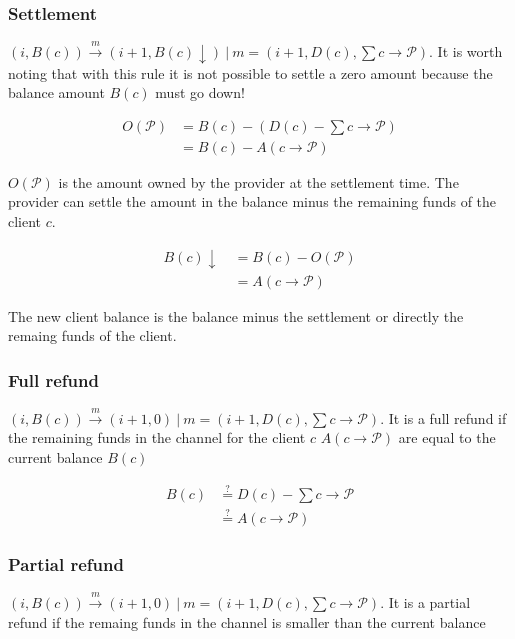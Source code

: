 \documentclass{llncs}
\begin{document}
\subsubsection{Settlement} $(i, B(c)) \xrightarrow{m} (i+1, B(c)\downarrow)\ |\ m = (i+1, D(c), \sum c \rightarrow \mathcal{P})$. It is worth noting that with this rule it is not possible to settle a zero amount because the balance amount $B(c)$ must go down!

\begin{equation*}
\begin{split}
    O(\mathcal{P}) &= B(c) - (D(c) - \textstyle \sum c \rightarrow \mathcal{P}) \\
    &= B(c) - A(c \rightarrow \mathcal{P})
\end{split}
\end{equation*}

$O(\mathcal{P})$ is the amount owned by the provider at the settlement time. The provider can settle the amount in the balance minus the remaining funds of the client $c$.

\begin{equation*}
\begin{split}
    B(c)\downarrow \ &= B(c) - O(\mathcal{P}) \\
    &= A(c \rightarrow \mathcal{P})
\end{split}
\end{equation*}

The new client balance is the balance minus the settlement or directly the remaing funds of the client.

\subsubsection{Full refund} $(i, B(c)) \xrightarrow{m} (i+1, 0)\ |\ m = (i+1, D(c), \sum c \rightarrow \mathcal{P})$. It is a full refund if the remaining funds in the channel for the client $c$ $A(c \rightarrow \mathcal{P})$ are equal to the current balance $B(c)$

\begin{equation*}
\begin{split}
    B(c) &\overset{?}{=} D(c) - \textstyle \sum c \rightarrow \mathcal{P} \\
    &\overset{?}{=} A(c \rightarrow \mathcal{P})
\end{split}
\end{equation*}

\subsubsection{Partial refund} $(i, B(c)) \xrightarrow{m} (i+1, 0)\ |\ m = (i+1, D(c), \sum c \rightarrow \mathcal{P})$. It is a partial refund if the remaing funds in the channel is smaller than the current balance
\end{document}
